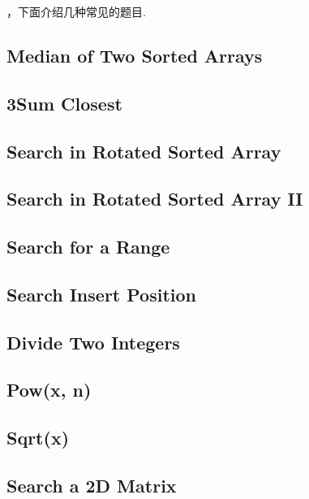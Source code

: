 \documentclass{article}
\begin{document}
\begin{CJK}{UTF8}{gbsn}     %

\else
    
，下面介绍几种常见的题目.
\\
\fi
\subsection{Median of Two Sorted Arrays}

\subsection{3Sum Closest}

\subsection{Search in Rotated Sorted Array}

\subsection{Search in Rotated Sorted Array II}

\subsection{Search for a Range}

\subsection{Search Insert Position}

\subsection{Divide Two Integers}

\subsection{Pow(x, n)}

\subsection{Sqrt(x)}

\subsection{Search a 2D Matrix}


\end{CJK}
\end{document}
